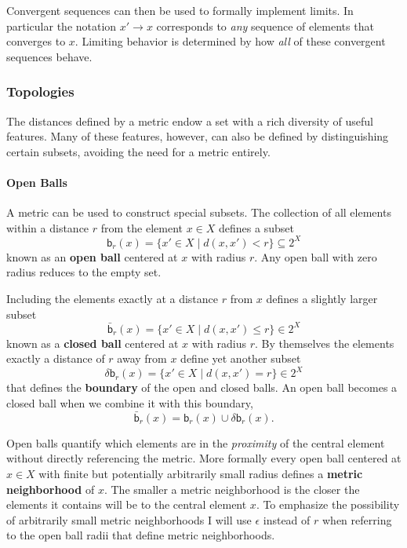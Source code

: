 \documentclass[
  letterpaper,
  DIV=11,
  numbers=noendperiod]{scrartcl}
\let\oldparagraph\paragraph
\renewcommand{\paragraph}[1]{\oldparagraph{#1}\mbox{}}
\begin{document}
Convergent sequences can then be used to formally implement limits. In
particular the notation \(x' \rightarrow x\) corresponds to \emph{any}
sequence of elements that converges to \(x\). Limiting behavior is
determined by how \emph{all} of these convergent sequences behave.

\hypertarget{sec:topologies}{%
\subsubsection{Topologies}\label{sec:topologies}}

The distances defined by a metric endow a set with a rich diversity of
useful features. Many of these features, however, can also be defined by
distinguishing certain subsets, avoiding the need for a metric entirely.

\hypertarget{sec:open-balls}{%
\paragraph{Open Balls}\label{sec:open-balls}}

A metric can be used to construct special subsets. The collection of all
elements within a distance \(r\) from the element \(x \in X\) defines a
subset \[
\mathsf{b}_{r}(x) = \{ x' \in X \mid d(x, x') < r \} \subseteq 2^{X}
\] known as an \textbf{open ball} centered at \(x\) with radius \(r\).
Any open ball with zero radius reduces to the empty set.

Including the elements exactly at a distance \(r\) from \(x\) defines a
slightly larger subset \[
\bar{\mathsf{b}}_{r}(x) = \{ x' \in X \mid d(x, x') \le r \} \in 2^{X}
\] known as a \textbf{closed ball} centered at \(x\) with radius \(r\).
By themselves the elements exactly a distance of \(r\) away from \(x\)
define yet another subset \[
\delta \mathsf{b}_{r}(x) = \{ x' \in X \mid d(x, x') = r \} \in 2^{X}
\] that defines the \textbf{boundary} of the open and closed balls. An
open ball becomes a closed ball when we combine it with this boundary,
\[
\bar{\mathsf{b}}_{r}(x) = \mathsf{b}_{r}(x) \cup \delta \mathsf{b}_{r}(x).
\]

Open balls quantify which elements are in the \emph{proximity} of the
central element without directly referencing the metric. More formally
every open ball centered at \(x \in X\) with finite but potentially
arbitrarily small radius defines a \textbf{metric neighborhood} of
\(x\). The smaller a metric neighborhood is the closer the elements it
contains will be to the central element \(x\). To emphasize the
possibility of arbitrarily small metric neighborhoods I will use
\(\epsilon\) instead of \(r\) when referring to the open ball radii that
define metric neighborhoods.
\end{document}
